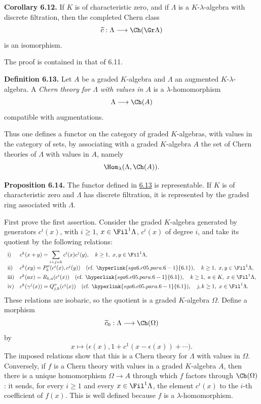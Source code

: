 \textbf{Corollary 6.12.} If \(K\) is of characteristic zero, and if \(\Lambda\) is a \(K\)-\(\lambda\)-algebra with discrete filtration, then the completed Chern class
\[
  \widetilde c:\Lambda\longrightarrow \Ch(\Gr\Lambda)
\]
is an isomorphism.

The proof is contained in that of 6.11.

\textbf{Definition 6.13.} Let \(A\) be a graded \(K\)-algebra and \(\Lambda\) an augmented \(K\)-\(\lambda\)-algebra. A \emph{Chern theory for \(\Lambda\) with values in \(A\)} is a \(\lambda\)-homomorphism
\[
  \Lambda\longrightarrow \Ch(A)
\]
compatible with augmentations.

Thus one defines a functor on the category of graded \(K\)-algebras, with values in the category of sets, by associating with a graded \(K\)-algebra \(A\) the set of Chern theories of \(\Lambda\) with values in \(A\), namely
\[
  \Hom_\lambda(\Lambda,\Ch(A)).
\]

\textbf{Proposition 6.14.} The functor defined in \hyperlink{sga6.e05.def.6-13}{6.13} is representable. If \(K\) is of characteristic zero and \(\Lambda\) has discrete filtration, it is represented by the graded ring associated with \(\Lambda\).

First prove the first assertion. Consider the graded \(K\)-algebra generated by generators \(c^i(x)\), with \(i\ge1\), \(x\in\Fil^1\Lambda\), \(c^i(x)\) of degree \(i\), and take its quotient by the following relations:
\[
\begin{array}{ll}
\text{i)}&
 c^k(x+y)=\displaystyle\sum_{i+j=k}c^i(x)c^j(y),
 \quad k\ge1,\ x,y\in\Fil^1\Lambda,\\[0.8em]
\text{ii)}&
 c^k(xy)=P''_k(c^i(x),c^j(y))
 \quad(\text{cf. }\hyperlink{sga6.e05.para.6-1}{6.1}),
 \quad k\ge1,\ x,y\in\Fil^1\Lambda,\\[0.4em]
\text{iii)}&
 c^k(ax)=R_{k,a}(c^i(x))
 \quad(\text{cf. }\hyperlink{sga6.e05.para.6-1}{6.1}),
 \quad k\ge1,\ a\in K,\ x\in\Fil^1\Lambda,\\[0.4em]
\text{iv)}&
 c^k(\gamma^j(x))=Q''_{j,k}(c^i(x))
 \quad(\text{cf. }\hyperlink{sga6.e05.para.6-1}{6.1}),
 \quad j,k\ge1,\ x\in\Fil^1\Lambda.
\end{array}
\]
These relations are isobaric, so the quotient is a graded \(K\)-algebra \(\Omega\). Define a morphism
\[
  \widetilde c_0:\Lambda\longrightarrow \Ch(\Omega)
\]
by
\[
  x\longmapsto
  \bigl(\epsilon(x),1+c^1(x-\epsilon(x))+\cdots\bigr).
\]
The imposed relations show that this is a Chern theory for \(\Lambda\) with values in \(\Omega\). Conversely, if \(f\) is a Chern theory with values in a graded \(K\)-algebra \(A\), then there is a unique homomorphism \(\Omega\to A\) through which \(f\) factors through \(\Ch(\Omega)\): it sends, for every \(i\ge1\) and every \(x\in\Fil^1\Lambda\), the element \(c^i(x)\) to the \(i\)-th coefficient of \(f(x)\). This is well defined because \(f\) is a \(\lambda\)-homomorphism.

